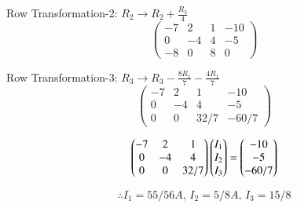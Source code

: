 \documentclass[journal]{IEEEtran}
\begin{document}
Row Transformation-2: $R_2 \rightarrow R_2 + \frac{R_3}{4}$
\begin{equation}
\left(
\begin{array}{ccc|c}
     -7 & 2 & 1 & -10  \\
     0 & -4 & 4 & -5 \\
     -8 & 0 & 8 & 0 
\end{array}
\right)
\end{equation}

Row Transformation-3: $R_3 \rightarrow R_3 - \frac{8R_1}{7} - \frac{4R_1}{7}$
\begin{equation}
\left(
\begin{array}{ccc|c}
     -7 & 2 & 1 & -10  \\
     0 & -4 & 4 & -5 \\
     0 & 0 & 32/7 & -60/7 
\end{array}
\right)
\end{equation}

\bigskip

\begin{equation}
    \begin{pmatrix}-7 &  2 & 1 \\ 0 & -4 & 4 \\ 0 & 0 & 32/7 \end{pmatrix}\begin{pmatrix}I_1 \\ I_2 \\ I_3\end{pmatrix} = \begin{pmatrix}-10 \\ -5 \\ -60/7 \end{pmatrix}
\end{equation}

\bigskip

\begin{equation}
\boxed{\therefore I_1 = 55/56 A, \, I_2 = 5/8 A, \, I_3 = 15/8}
\end{equation}
\end{document}
